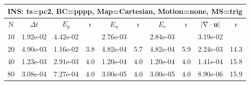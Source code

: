 
\begin{tabular}{|c|c|c|c|c|c|c|c|c|c|} \hline
 \multicolumn{10}{|c|}{INS: ts=pc2, BC=pppp, Map=Cartesian, Motion=none, MS=trig } \\ \hline 
     N  &   $\Delta t$ & $E_p$   &  r  &   $E_u$   &   r    &   $E_v$   & r   &  $|\nabla\cdot\mathbf{ u}|$  & r   \\ \hline 
  10   &  1.92e-02  &   4.42e-02  &        &   2.76e-03  &        &   2.84e-03  &        &   3.19e-02  &        \\ 
  20   &  4.90e-03  &   1.16e-02  & 3.8  &   4.82e-04  & 5.7  &   4.82e-04  & 5.9  &   2.24e-03  & 14.3  \\ 
  40   &  1.23e-03  &   2.91e-03  & 4.0  &   1.20e-04  & 4.0  &   1.20e-04  & 4.0  &   1.41e-04  & 15.8  \\ 
  80   &  3.08e-04  &   7.27e-04  & 4.0  &   3.00e-05  & 4.0  &   3.00e-05  & 4.0  &   8.90e-06  & 15.9  \\ 
 \hline 
\end{tabular}
